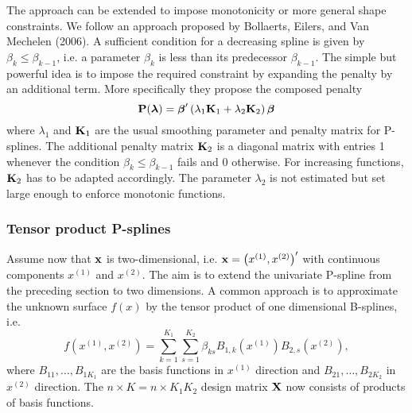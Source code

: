 \documentclass[11pt,a4paper,twoside]{bayesxarticle}
\begin{document}
The approach can be extended to impose monotonicity or more general shape constraints.
We follow an approach proposed by Bollaerts, Eilers, and Van Mechelen (2006).
A sufficient condition for a decreasing
spline is given by $\beta_{k} \leq \beta_{k-1}$, i.e.  a parameter $\beta_{k}$ is less than its predecessor $\beta_{k-1}$.
The simple but powerful idea  is to impose the
required constraint by expanding the penalty by an additional  term. More specifically they propose
the composed penalty
$$
\mathbf{P}(\boldsymbol{\lambda}) =  \boldsymbol{\beta}' \left( \lambda_1 \mathbf{K}_1 + \lambda_2 \mathbf{K}_2 \right) \boldsymbol{\beta}
$$
where $\lambda_1$ and $\mathbf{K}_1$ are the usual smoothing parameter
and penalty matrix for P-splines. The additional penalty matrix
$\mathbf{K}_2$ is a diagonal matrix with entries 1 whenever the condition
$\beta_{k} \leq \beta_{k-1}$ fails and 0 otherwise. For increasing
functions, $\mathbf{K}_2$ has to be adapted accordingly. The parameter
$\lambda_2$ is not estimated but set large enough to enforce
monotonic functions.





\subsubsection{Tensor product P-splines}
\label{tensorproductpsplines} Assume now that $\mathbf{x}$ is
two-dimensional, i.e. $\mathbf{x} = \left(x^{(1)},x^{(2)}\right)'$ with
continuous components $x^{(1)}$ and $x^{(2)}$. The aim is to extend
the univariate P-spline from the preceding section to two
dimensions. A common approach is to approximate the unknown surface
$f(x)$ by the tensor product of one dimensional B-splines, i.e.
\begin{equation}
\label{gampspline_2dimterm} f\left(x^{(1)},x^{(2)}\right) = \sum_{k=1}^{K_1}
\sum_{s=1}^{K_2} \beta_{ks} B_{1,k}(x^{(1)})
B_{2,s} (x^{(2)}),
\end{equation}
where $B_{11},\dots,B_{1K_1}$ are the basis functions in $x^{(1)}$ direction and
$B_{21},\dots,B_{2K_2}$ in $x^{(2)}$ direction.
The $n \times K = n \times K_1 K_2$ design matrix $\mathbf{X}$ now consists of
products of basis functions.
\end{document}
